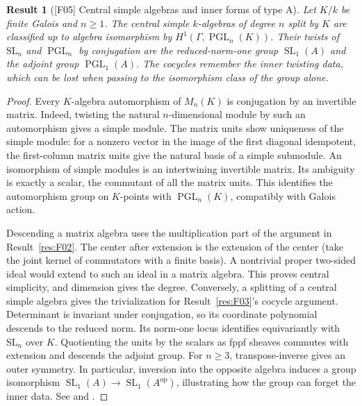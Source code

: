 \documentclass[11pt,a4paper,openany,oneside]{book}
\theoremstyle{resultstyle}
\newtheorem{statement}{Result}[chapter]
\newenvironment{result}[2]{\clubpenalty=10000\begin{statement}[\textnormal{[#1]} #2]\leavevmode\label{res:#1}\ignorespaces}{\end{statement}}
\theoremstyle{definition}
\numberwithin{equation}{chapter}
\newcommand{\SL}{\mathrm{SL}}
\begin{document}
\begin{result}{F05}{Central simple algebras and inner forms of type A}
Let $K/k$ be finite Galois and $n\geq 1$. The central simple $k$-algebras of degree $n$ split by $K$ are classified up to algebra isomorphism by $H^1(\Gamma,\operatorname{PGL}_n(K))$. Their twists of $\SL_n$ and $\operatorname{PGL}_n$ by conjugation are the reduced-norm-one group $\operatorname{SL}_1(A)$ and the adjoint group $\operatorname{PGL}_1(A)$. The cocycles remember the inner twisting data, which can be lost when passing to the isomorphism class of the group alone.
\end{result}
\begin{proof}
Every $K$-algebra automorphism of $M_n(K)$ is conjugation by an invertible matrix. Indeed, twisting the natural $n$-dimensional module by such an automorphism gives a simple module. The matrix units show uniqueness of the simple module: for a nonzero vector in the image of the first diagonal idempotent, the first-column matrix units give the natural basis of a simple submodule. An isomorphism of simple modules is an intertwining invertible matrix. Its ambiguity is exactly a scalar, the commutant of all the matrix units. This identifies the automorphism group on $K$-points with $\operatorname{PGL}_n(K)$, compatibly with Galois action.

Descending a matrix algebra uses the multiplication part of the argument in Result~\ref{res:F02}. The center after extension is the extension of the center (take the joint kernel of commutators with a finite basis). A nontrivial proper two-sided ideal would extend to such an ideal in a matrix algebra. This proves central simplicity, and dimension gives the degree. Conversely, a splitting of a central simple algebra gives the trivialization for Result~\ref{res:F03}'s cocycle argument. Determinant is invariant under conjugation, so its coordinate polynomial descends to the reduced norm. Its norm-one locus identifies equivariantly with $\SL_n$ over $K$. Quotienting the units by the scalars as fppf sheaves commutes with extension and descends the adjoint group. For $n\geq3$, transpose-inverse gives an outer symmetry. In particular, inversion into the opposite algebra induces a group isomorphism $\operatorname{SL}_1(A)\to\operatorname{SL}_1(A^{\mathrm{op}})$, illustrating how the group can forget the inner data. See \cite[Secs.~2.4.1--2.4.3]{gs} and \cite[Secs.~24.22--24.25 and 24.f]{milne}.
\end{proof}
\end{document}
